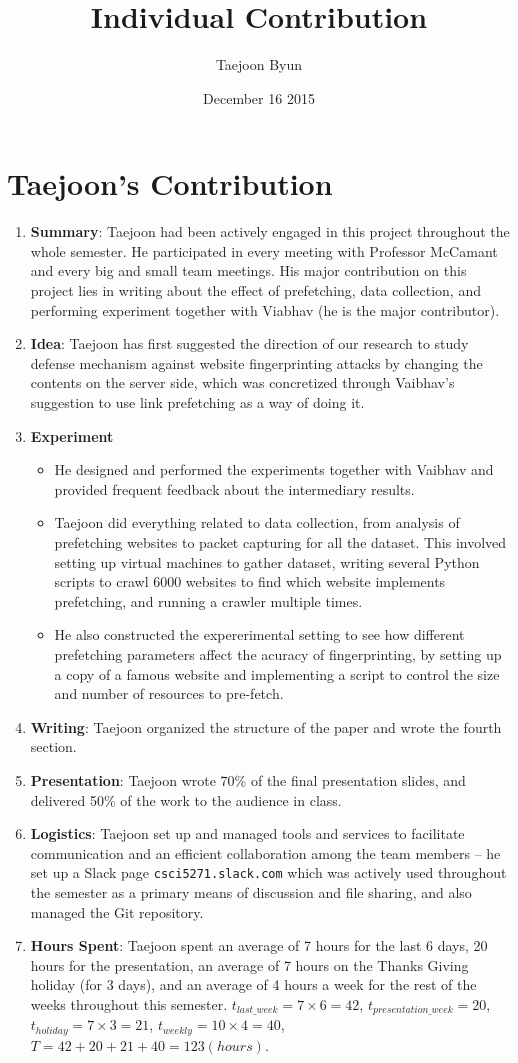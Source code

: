 \documentclass{article}
\title{Individual Contribution}
\author{Taejoon Byun}
\date{December 16 2015}
\begin{document}
\section{Taejoon's Contribution}
\begin{enumerate}
\item
{\bf Summary}:
Taejoon had been actively engaged in this project throughout the whole semester.
He participated in every meeting with Professor McCamant and every big and small team meetings.
His major contribution on this project lies in writing about the effect of prefetching, data collection, and performing experiment together with Viabhav (he is the major contributor).
\item
{\bf Idea}: Taejoon has first suggested the direction of our research to study defense mechanism against website fingerprinting attacks by changing the contents on the server side, which was concretized through Vaibhav's suggestion to use link prefetching as a way of doing it.
\item
{\bf Experiment}
\begin{itemize}
\item
He designed and performed the experiments together with Vaibhav and provided frequent feedback about the intermediary results.
\item
Taejoon did everything related to data collection, from analysis of prefetching websites to packet capturing for all the dataset.
This involved setting up virtual machines to gather dataset, writing several Python scripts to crawl 6000 websites to find which website implements prefetching, and running a crawler multiple times.
\item
He also constructed the expererimental setting to see how different prefetching parameters affect the acuracy of fingerprinting, by setting up a copy of a famous website and implementing a script to control the size and number of resources to pre-fetch.
\end{itemize}
\item
{\bf Writing}: Taejoon organized the structure of the paper and wrote the fourth section.
\item
{\bf Presentation}: Taejoon wrote 70\% of the final presentation slides, and delivered 50\% of the work to the audience in class.
\item
{\bf Logistics}: Taejoon set up and managed tools and services to facilitate communication and an efficient collaboration among the team members -- he set up a Slack page {\tt csci5271.slack.com} which was actively used throughout the semester as a primary means of discussion and file sharing, and also managed the Git repository.
\item
{\bf Hours Spent}: Taejoon spent an average of 7 hours for the last 6 days, 20 hours for the presentation, an average of 7 hours on the Thanks Giving holiday (for 3 days), and an average of 4 hours a week for the rest of the weeks throughout this semester.
$t_{\mathit{last\_week}} = 7 \times 6 = 42$,
$t_{\mathit{presentation\_week}} = 20$,
$t_{\mathit{holiday}} = 7 \times 3 = 21$,
$t_{\mathit{weekly}} = 10 \times 4 = 40$,
$T = 42 + 20 + 21 + 40 = 123 (hours)$.
\end{enumerate}
\end{document}
